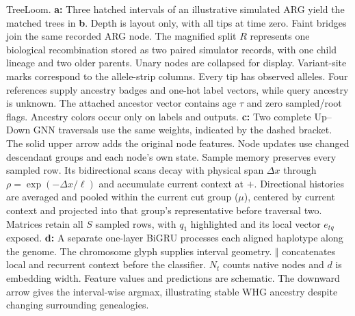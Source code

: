 \caption{TreeLoom. \textbf{a:} Three hatched intervals of an illustrative simulated ARG yield the matched trees in \textbf{b}. Depth is layout only, with all tips at time zero. Faint bridges join the same recorded ARG node. The magnified split $R$ represents one biological recombination stored as two paired simulator records, with one child lineage and two older parents. Unary nodes are collapsed for display. Variant-site marks correspond to the allele-strip columns. Every tip has observed alleles. Four references supply ancestry badges and one-hot label vectors, while query ancestry is unknown. The attached ancestor vector contains age $\tau$ and zero sampled/root flags. Ancestry colors occur only on labels and outputs. \textbf{c:} Two complete Up--Down GNN traversals use the same weights, indicated by the dashed bracket. The solid upper arrow adds the original node features. Node updates use changed descendant groups and each node's own state. Sample memory preserves every sampled row. Its bidirectional scans decay with physical span $\Delta x$ through $\rho=\exp(-\Delta x/\ell)$ and accumulate current context at $+$. Directional histories are averaged and pooled within the current cut group ($\mu$), centered by current context and projected into that group's representative before traversal two. Matrices retain all $S$ sampled rows, with $q_1$ highlighted and its local vector $e_{tq}$ exposed. \textbf{d:} A separate one-layer BiGRU processes each aligned haplotype along the genome. The chromosome glyph supplies interval geometry. $\Vert$ concatenates local and recurrent context before the classifier. $N_t$ counts native nodes and $d$ is embedding width. Feature values and predictions are schematic. The downward arrow gives the interval-wise argmax, illustrating stable WHG ancestry despite changing surrounding genealogies.}
